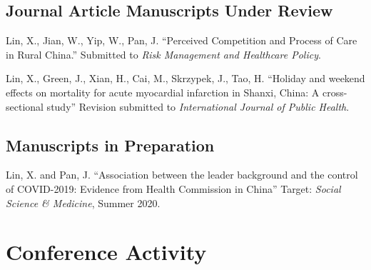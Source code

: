 \documentclass[12pt,letterpaper]{report}
\begin{document}
    \subsection*{Journal Article Manuscripts Under Review}

    \begin{tablist}
        
        \item[\the\year] \tab Lin, X., Jian, W., Yip, W., Pan, J. \enquote{Perceived Competition and Process of Care in Rural China.} Submitted to  \textit{Risk Management and Healthcare Policy}.        

        \item[\the\year] \tab Lin, X., Green, J., Xian, H., Cai, M., Skrzypek, J., Tao, H. \enquote{Holiday and weekend effects on mortality for acute myocardial infarction in Shanxi, China:  A cross-sectional study} Revision submitted to  \textit{International Journal of Public Health}.

    \end{tablist}






 
    \subsection*{Manuscripts in Preparation}

    \begin{tablist}
        
		\item[\the\year] \tab Lin, X. and Pan, J. \enquote{Association between the leader background and the control of COVID-2019: Evidence from Health Commission in China} Target: \textit{Social Science \& Medicine}, Summer 2020.
		
     \end{tablist}

    \section*{Conference Activity}
\end{document}
